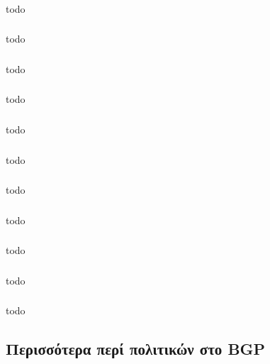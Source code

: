\documentclass[a4paper, 12pt]{article}
\begin{document}
		\subsubsection{}
			todo

		\subsubsection{}
			todo

		\subsubsection{}
			todo

		\subsubsection{}
			todo

		\subsubsection{}
			todo

		\subsubsection{}
			todo

		\subsubsection{}
			todo

		\subsubsection{}
			todo

		\subsubsection{}
			todo

		\subsubsection{}
			todo

		\subsubsection{}
			todo

	\subsection{Περισσότερα περί πολιτικών στο BGP}
\end{document}
